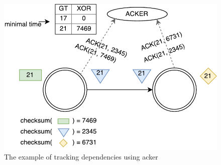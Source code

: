 \begin{figure}[htbp]
  \centering
  \includegraphics[scale=0.58]{pics/acker}
  \caption{The example of tracking dependencies using acker}
  \label {acker}
\end{figure}